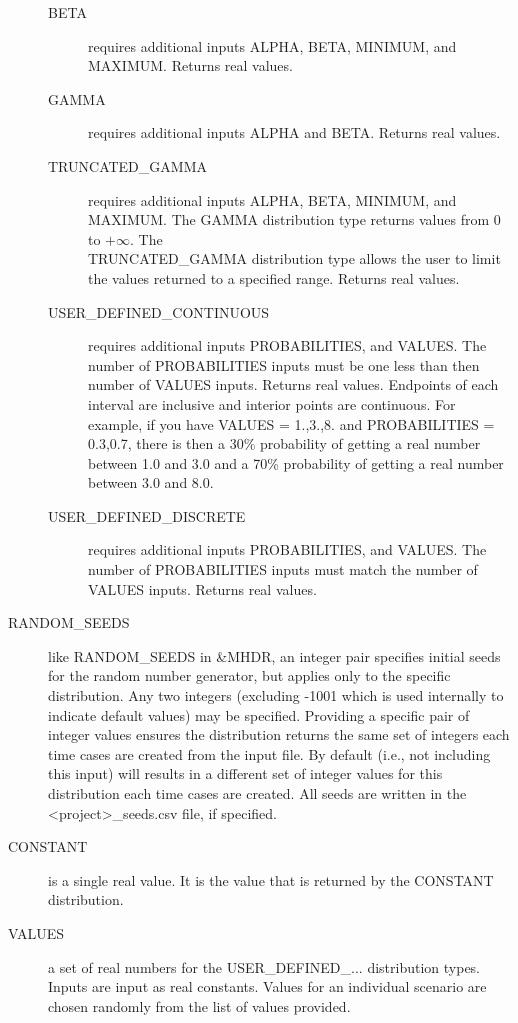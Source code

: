 \documentclass[12pt,twoside]{book}
\begin{document}
\begin{description}
\begin{description}
        \item[BETA] requires additional inputs {\ct ALPHA}, {\ct BETA}, {\ct MINIMUM}, and {\ct MAXIMUM}. Returns real values.
        \item[GAMMA] requires additional inputs {\ct ALPHA} and {\ct BETA}. Returns real values.
        \item[TRUNCATED\_GAMMA] requires additional inputs {\ct ALPHA}, {\ct BETA}, {\ct MINIMUM}, and {\ct MAXIMUM}. The {\ct GAMMA} distribution type returns values from $0$ to $+\infty$. The \\
            {\ct TRUNCATED\_GAMMA} distribution type allows the user to limit the values returned to a specified range. Returns real values.
        \item[USER\_DEFINED\_CONTINUOUS] requires additional inputs {\ct PROBABILITIES}, and
{\ct VALUES}. The number of {\ct PROBABILITIES} inputs must be one less than then number of {\ct VALUES} inputs. Returns real values. Endpoints of each interval are inclusive and interior points are continuous. For example, if you have {\ct VALUES} = 1.,3.,8. and {\ct PROBABILITIES} = 0.3,0.7, there is then a 30\% probability of getting a real number between 1.0 and 3.0 and a 70\% probability of getting a real number between 3.0 and 8.0.
        \item[USER\_DEFINED\_DISCRETE] requires additional inputs {\ct PROBABILITIES}, and
{\ct VALUES}. The number of {\ct PROBABILITIES} inputs must match the number of \\
{\ct VALUES} inputs. Returns real values.
      \end{description}
  \item[RANDOM\_SEEDS] like {\ct RANDOM\_SEEDS} in {\ct \&MHDR}, an integer pair specifies initial seeds for the random number generator, but applies only to the specific distribution. Any two integers (excluding -1001 which is used internally to indicate default values) may be specified. Providing a specific pair of integer values ensures the distribution returns the same set of integers each time cases are created from the input file. By default (i.e., not including this input) will results in a different set of integer values for this distribution each time cases are created.  All seeds are written in the {\ct <project>\_seeds.csv} file, if specified.
  \item[CONSTANT] is a single real value. It is the value that is returned by the {\ct CONSTANT} distribution.
  \item[VALUES] a set of real numbers for the {\ct USER\_DEFINED\_...} distribution types. Inputs are input as real constants. Values for an individual scenario are chosen randomly from the list of values provided.

\end{description}
\end{document}
